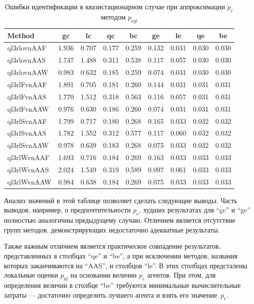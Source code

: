 \begin{table}[htb!]
  \caption{Ошибки идентификации в квазистационарном случае при аппроксимации $p_e$ методом $p_{eql}$}
  \label{atu:t:err_test_id_ql}
  \begin{center}
    \begin{tabular}{|l|c|c|c|c|c|c|c|c|}
    \hline
    Method      & gc    & lc    & qc    & bc    & ge     & le    & qe    & be    \\ \hline
    ql3rlovnAAF & 1.936 & 0.707 & 0.177 & 0.259 & 0.132  & 0.031 & 0.030 & 0.030 \\ \hline
    ql3rlovnAAS & 1.747 & 1.488 & 0.311 & 0.538 & 0.117  & 0.057 & 0.030 & 0.030 \\ \hline
    ql3rlovnAAW & 0.983 & 0.632 & 0.185 & 0.259 & 0.074  & 0.031 & 0.030 & 0.030 \\ \hline
    ql3rlFvnAAF & 1.891 & 0.705 & 0.181 & 0.260 & 0.144  & 0.031 & 0.031 & 0.031 \\ \hline
    ql3rlFvnAAS & 1.770 & 1.512 & 0.318 & 0.563 & 0.116  & 0.057 & 0.031 & 0.031 \\ \hline
    ql3rlFvnAAW & 0.976 & 0.630 & 0.186 & 0.260 & 0.074  & 0.031 & 0.031 & 0.031 \\ \hline
    ql3rlSvnAAF & 1.799 & 0.717 & 0.180 & 0.268 & 0.165  & 0.033 & 0.032 & 0.032 \\ \hline
    ql3rlSvnAAS & 1.782 & 1.552 & 0.312 & 0.577 & 0.117  & 0.060 & 0.032 & 0.032 \\ \hline
    ql3rlSvnAAW & 0.978 & 0.639 & 0.183 & 0.268 & 0.075  & 0.033 & 0.032 & 0.032 \\ \hline
    ql3rlWvnAAF & 1.693 & 0.716 & 0.184 & 0.269 & 0.163  & 0.033 & 0.033 & 0.033 \\ \hline
    ql3rlWvnAAS & 2.024 & 1.549 & 0.319 & 0.589 & 0.097  & 0.061 & 0.033 & 0.033 \\ \hline
    ql3rlWvnAAW & 0.984 & 0.638 & 0.184 & 0.269 & 0.075  & 0.033 & 0.033 & 0.033 \\ \hline
    \end{tabular}
  \end{center}
\end{table}

Анализ значений в этой таблице позволяет сделать следующие выводы.
Часть выводов, например, о предпочтительности $p_e$,
худших результатах для ``gc'' и ``ge'' полностью аналогичны
предыдущему случаю. Отличием является отсутствие групп
методов, демонстрирующих недостаточно адекватные результаты.

Также важным отличием является практическое совпадение
результатов, представленных в столбцах ``qe'' и ``be'',
а при исключении методов, названия которых заканчиваются на ``AAS'',
и столбцов ``le''. В этих столбцах предсталены локальные оценки $p_\mathrm{id}$
на основании величин $p_e$ агентов. При этом,
для определения величин в столбце ``be'' требуются минимальные вычислительные
затраты --- достаточно определить лучшего агента и взять его значение~$p_e$.

